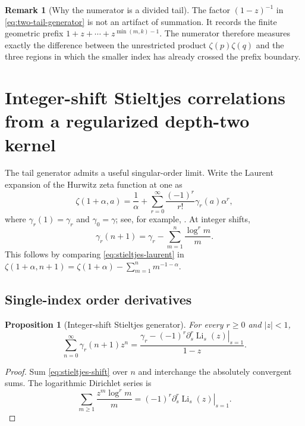 \documentclass[11pt]{article}
\newtheorem{proposition}[theorem]{Proposition}
\theoremstyle{definition}
\newtheorem{remark}[theorem]{Remark}
\newcommand{\Li}{\operatorname{Li}}
\begin{document}
\begin{remark}[Why the numerator is a divided tail]
The factor $(1-z)^{-1}$ in \eqref{eq:two-tail-generator} is not an
artifact of summation.  It records the finite geometric prefix
$1+z+\cdots+z^{\min(m,k)-1}$.  The numerator therefore measures exactly
the difference between the unrestricted product $\zeta(p)\zeta(q)$ and
the three regions in which the smaller index has already crossed the
prefix boundary.
\end{remark}
 \section{Integer-shift Stieltjes correlations from a regularized depth-two kernel}
\label{sec:stieltjes-generator}

The tail generator admits a useful singular-order limit.  Write the
Laurent expansion of the Hurwitz zeta function at one as
\begin{equation}
 \zeta(1+\alpha,a)=\frac1\alpha+
 \sum_{r=0}^{\infty}\frac{(-1)^r}{r!}\gamma_r(a)\alpha^r,
 \label{eq:stieltjes-laurent}
\end{equation}
where $\gamma_r(1)=\gamma_r$ and $\gamma_0=\gamma$; see, for example,
\cite{DLMF,Coffey}.  At integer shifts,
\begin{equation}
 \gamma_r(n+1)=\gamma_r-
 \sum_{m=1}^n\frac{\log^r m}{m}.
 \label{eq:stieltjes-shift}
\end{equation}
This follows by comparing \eqref{eq:stieltjes-laurent} in
$\zeta(1+\alpha,n+1)=\zeta(1+\alpha)-\sum_{m=1}^nm^{-1-\alpha}$.

\subsection{Single-index order derivatives}

\begin{proposition}[Integer-shift Stieltjes generator]
\label{prop:single-stieltjes-generator}
For every $r\ge0$ and $|z|<1$,
\begin{equation}
 \boxed{\displaystyle
 \sum_{n=0}^{\infty}\gamma_r(n+1)z^n
 =\frac{\gamma_r-(-1)^r
 \left.\partial_s^r\Li_s(z)\right|_{s=1}}{1-z}.}
 \label{eq:single-stieltjes-generator}
\end{equation}
\end{proposition}

\begin{proof}
Sum \eqref{eq:stieltjes-shift} over $n$ and interchange the absolutely
convergent sums.  The logarithmic Dirichlet series is
\[
 \sum_{m\ge1}\frac{z^m\log^r m}{m}
 =(-1)^r\left.\partial_s^r\Li_s(z)\right|_{s=1}.
\]
\end{proof}
\end{document}
